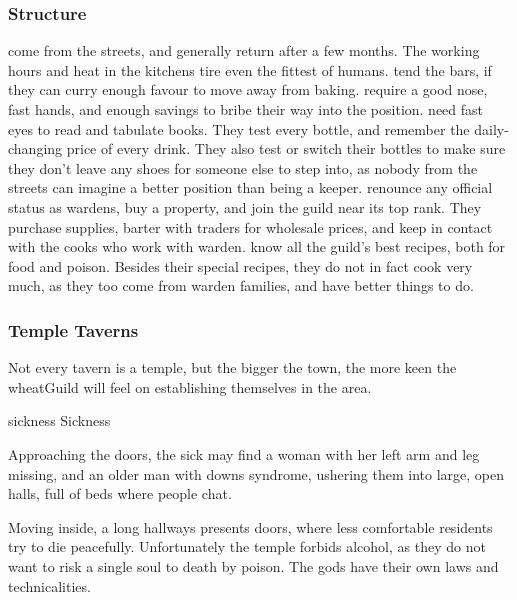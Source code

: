 \begin{multicols}{2}
\subsubsection{Structure}

\begin{description}
  come from the streets, and generally return after a few months.
  The working hours and heat in the kitchens tire even the fittest of humans.
  tend the bars, if they can curry enough favour to move away from baking.
  require a good nose, fast hands, and enough savings to bribe their way into the position.
  need fast eyes to read and tabulate books.
  They test every bottle, and remember the daily-changing price of every drink.
  They also test or switch their bottles to make sure they don't leave any shoes for someone else to step into, as nobody from the streets can imagine a better position than being a keeper.
  renounce any official status as \glspl{warden}, buy a property, and join the guild near its top rank.
  They purchase supplies, barter with traders for wholesale prices, and keep in contact with the cooks who work with \gls{warden}.
  know all the guild's best recipes, both for food and poison.
  Besides their special recipes, they do not in fact cook very much, as they too come from \gls{warden} families, and have better things to do.
\end{description}

\subsubsection{Temple Taverns}

Not every tavern is a temple, but the bigger the town, the more keen the \gls{wheatGuild} will feel on establishing themselves in the area.

  {\gls{sickness}}%
  {Sickness}%
  {
    Approaching the doors, the sick may find a woman with her left arm and leg missing, and an older man with downs syndrome, ushering them into large, open halls, full of beds where people chat.

    Moving inside, a long hallways presents doors, where less comfortable residents try to die peacefully.
    Unfortunately the temple forbids alcohol, as they do not want to risk a single soul to death by poison.
    The gods have their own laws and technicalities.

}
\end{multicols}
